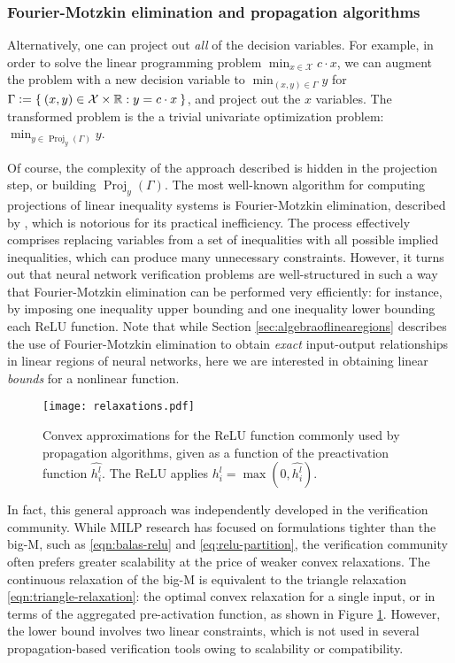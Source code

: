 \subsubsection{Fourier-Motzkin elimination and propagation algorithms}
\newcommand{\defeq}{\vcentcolon=}
Alternatively, one can project out \emph{all} of the decision variables. For example, in order to solve the linear programming problem $\min_{x \in \mathcal{X}} c \cdot x$, we can augment the problem with a new decision variable to $\min_{(x,y) \in \Gamma} y$ for $\Gamma \defeq \Set{(x,y) \in \mathcal{X} \times \mathbb{R} : y = c \cdot x}$, and project out the $x$ variables. The transformed problem is the a trivial univariate optimization problem: $\min_{y \in \operatorname{Proj}_y(\Gamma)} y$.

Of course, the complexity of the approach described is hidden in the projection step, or building $\operatorname{Proj}_y(\Gamma)$. The most well-known algorithm for computing projections of linear inequality systems is Fourier-Motzkin elimination, described by \cite{dantzig1973fourier}, which is notorious for its practical inefficiency. 
The process effectively comprises replacing variables from a set of inequalities with all possible implied inequalities, which can produce many unnecessary constraints.  
However, it turns out that neural network verification problems are well-structured in such a way that Fourier-Motzkin elimination can be performed very efficiently: for instance, by imposing one inequality upper bounding and one inequality lower bounding each ReLU function. 
Note that while Section \ref{sec:algebraoflinearegions} describes the use of Fourier-Motzkin elimination to obtain \emph{exact} input-output relationships in linear regions of neural networks, here we are interested in obtaining linear \emph{bounds} for a nonlinear function.

\begin{figure}
    \centering
    \texttt{[image: relaxations.pdf]}
    \caption{Convex approximations for the ReLU function commonly used by propagation algorithms, given as a function of the preactivation function $\hat{h_i^l}$. The ReLU applies $h_i^l = \max(0,\hat{h_i^l} )$.}
    \label{fig:convexapproximations}
\end{figure}

In fact, this general approach was independently developed in the verification community.
While MILP research has focused on formulations tighter than the big-M, such as \eqref{eqn:balas-relu} and \eqref{eq:relu-partition}, the verification community often prefers greater scalability at the price of weaker convex relaxations.
The continuous relaxation of the big-M is equivalent to the triangle relaxation \eqref{eqn:triangle-relaxation}: the optimal convex relaxation for a single input, or in terms of the aggregated pre-activation function, as shown in Figure \ref{fig:convexapproximations}.  
However, the lower bound involves two linear constraints, which is not used in several propagation-based verification tools owing to scalability or compatibility. 

